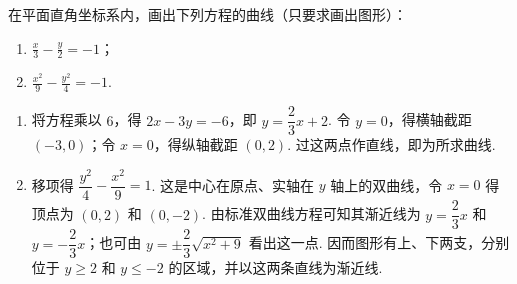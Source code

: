 \documentclass[UTF8,a4paper,oneside,11pt]{ctexbook}
\begin{document}
\begin{problem}

在平面直角坐标系内，画出下列方程的曲线（只要求画出图形）：

\begin{enumerate}
\item \(\frac{x}{3} - \frac{y}{2} = -1\)；
\item \(\frac{x^2}{9} - \frac{y^2}{4} = -1\).
\end{enumerate}

\begin{solution}
\begin{enumerate}
\item 将方程乘以 \(6\)，得 \(2x-3y=-6\)，即 \(y=\dfrac{2}{3}x+2\). 令 \(y=0\)，得横轴截距 \((-3,0)\)；令 \(x=0\)，得纵轴截距 \((0,2)\). 过这两点作直线，即为所求曲线.
\item 移项得 \(\dfrac{y^2}{4}-\dfrac{x^2}{9}=1\). 这是中心在原点、实轴在 \(y\) 轴上的双曲线，令 \(x=0\) 得顶点为 \((0,2)\) 和 \((0,-2)\). 由标准双曲线方程可知其渐近线为 \(y=\dfrac{2}{3}x\) 和 \(y=-\dfrac{2}{3}x\)；也可由 \(y=\pm\dfrac{2}{3}\sqrt{x^2+9}\) 看出这一点. 因而图形有上、下两支，分别位于 \(y\geqslant2\) 和 \(y\leqslant-2\) 的区域，并以这两条直线为渐近线.
\end{enumerate}
\end{solution}
\end{problem}
\end{document}
